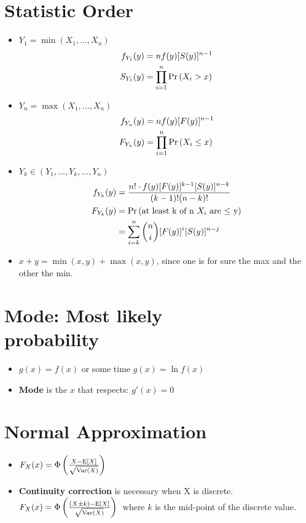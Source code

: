 \documentclass[10pt, french]{article}
\begin{document}
\begin{multicols*}{3}
\section*{Statistic Order}
\label{Appendix: Statistic Order}
\begin{itemize}[align=left,leftmargin=*]
    \item $Y_1 = \min(X_1, ... ,X_n)$
    \begin{align*}
        f_{Y_1}(y) &= nf(y)[S(y)]^{n-1} \\
        S_{Y_1}(y) &= \prod_{i=1}^n \Pr \left( X_i>x \right)
    \end{align*}
    \item $Y_n = \max(X_1, ... ,X_n)$
    \begin{align*}
        f_{Y_n}(y) &= nf(y)[F(y)]^{n-1} \\
        F_{Y_n}(y) &= \prod_{i=1}^n \Pr \left( X_i\leq x \right)
    \end{align*}
    \item $Y_k \in (Y_1,...,Y_k,...,Y_n)$
    \begin{align*}
        f_{Y_k}(y) &= \frac{n!\cdot f(y)[F(y)]^{k-1}[S(y)]^{n-k}}{(k-1)!(n-k)!} \\
        F_{Y_k}(y) &= \Pr \left( \text{at least k of n $X_i$ are $\leq$ y} \right) \\
                   &= \sum_{i=k}^n \binom{n}{i} [F(y)]^i[S(y)]^{n-j}
    \end{align*}
    \item $x+y=\min(x,y)+\max(x,y)$, since one is for sure the max and the other the min.
\end{itemize}

\section*{Mode: Most likely \\ probability}
\begin{itemize}[align=left,leftmargin=*]
    \item $g(x) = f(x)$ or some time $g(x) = \ln f(x)$
    \item \textbf{Mode} is the $x$ that respects: $g'(x) = 0$
\end{itemize}

\section*{Normal Approximation}
\begin{itemize}[align=left,leftmargin=*]    
    \item $F_X(x) = \Phi \left( \frac{X - \mathrm{E} {\left[ X \right]}}{\sqrt{\mathrm{Var} {\left( X \right)}}} \right)$
    \item \textbf{Continuity correction} is necessary when X is discrete. $F_X(x) = \Phi \left( \frac{(X \pm k) - \mathrm{E} {\left[ X \right]}}{\sqrt{\mathrm{Var} {\left( X \right)}}} \right)\:$ where $k$ is the mid-point of the discrete value.
\end{itemize}


\end{multicols*}
\end{document}
